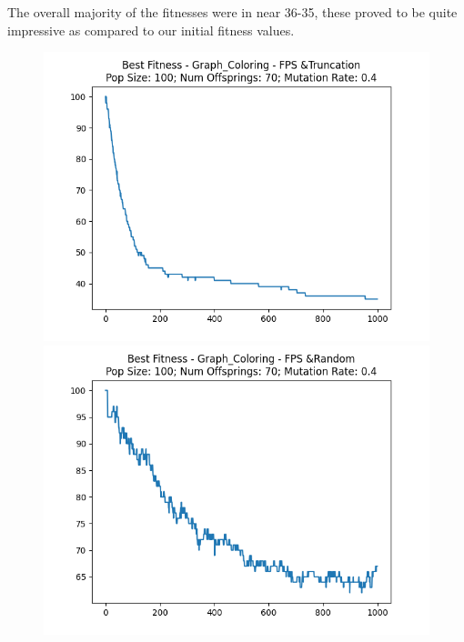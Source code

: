 \documentclass[12pt]{report}
\theoremstyle{mytheoremstyle}
\theoremstyle{mytheoremstyle}
\theoremstyle{myproblemstyle}
\begin{document}
The overall majority of the fitnesses were in near 36-35, these proved to be quite impressive as compared to our initial fitness values.
\begin{figure}[!]

	\begin{minipage}{0.4\textwidth}
		\includegraphics[width=\linewidth]{../Analysis/BSF_Graph_Coloring_0_3_100_70.png}
	\end{minipage}
	\hspace{\fill}
	\begin{minipage}{0.4\textwidth}
		\includegraphics[width=\linewidth]{../Analysis/BSF_Graph_Coloring_0_4_100_70.png}
	\end{minipage}
	\vspace*{1cm}

\end{figure}
\end{document}
